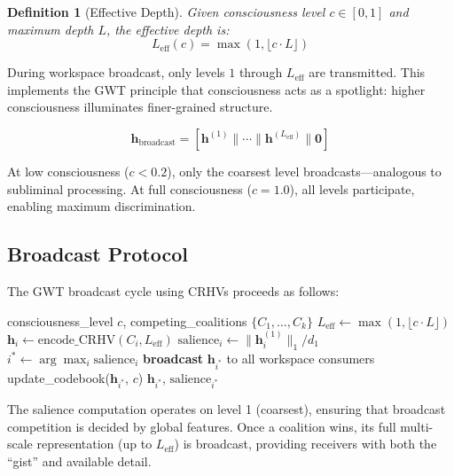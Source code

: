 \documentclass[11pt,a4paper]{article}
\newtheorem{definition}{Definition}
\begin{document}
\begin{definition}[Effective Depth]
Given consciousness level $c \in [0, 1]$ and maximum depth $L$, the effective depth is:
\begin{equation}
L_{\text{eff}}(c) = \max(1, \lfloor c \cdot L \rfloor)
\end{equation}
\end{definition}

During workspace broadcast, only levels $1$ through $L_{\text{eff}}$ are transmitted. This implements the GWT principle that consciousness acts as a spotlight: higher consciousness illuminates finer-grained structure.

\begin{equation}
\mathbf{h}_{\text{broadcast}} = [\mathbf{h}^{(1)} \| \cdots \| \mathbf{h}^{(L_{\text{eff}})} \| \mathbf{0}]
\end{equation}

At low consciousness ($c < 0.2$), only the coarsest level broadcasts---analogous to subliminal processing. At full consciousness ($c = 1.0$), all levels participate, enabling maximum discrimination.

\subsection{Broadcast Protocol}

The GWT broadcast cycle using CRHVs proceeds as follows:

\begin{algorithm}[h]
\caption{CRHV Global Workspace Broadcast}
\label{alg:broadcast}
\begin{algorithmic}[1]
\REQUIRE consciousness\_level $c$, competing\_coalitions $\{C_1, \ldots, C_k\}$
\STATE $L_{\text{eff}} \leftarrow \max(1, \lfloor c \cdot L \rfloor)$
    \STATE $\mathbf{h}_i \leftarrow \text{encode\_CRHV}(C_i, L_{\text{eff}})$
    \STATE $\text{salience}_i \leftarrow \|\mathbf{h}_i^{(1)}\|_1 / d_1$ 
\ENDFOR
\STATE $i^* \leftarrow \arg\max_i \text{salience}_i$ 
\STATE \textbf{broadcast} $\mathbf{h}_{i^*}$ to all workspace consumers
\STATE update\_codebook($\mathbf{h}_{i^*}$, $c$)
\RETURN $\mathbf{h}_{i^*}$, $\text{salience}_{i^*}$
\end{algorithmic}
\end{algorithm}

The salience computation operates on level 1 (coarsest), ensuring that broadcast competition is decided by global features. Once a coalition wins, its full multi-scale representation (up to $L_{\text{eff}}$) is broadcast, providing receivers with both the ``gist'' and available detail.
\end{document}

